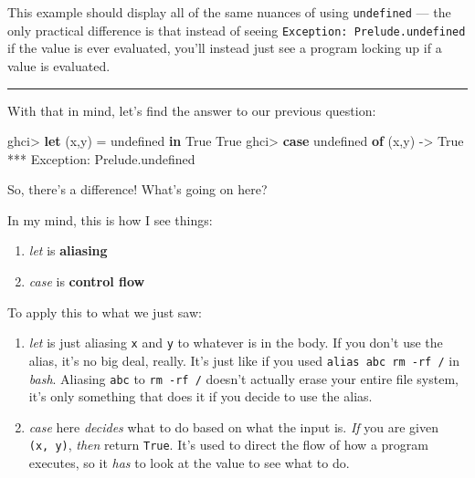 \documentclass[]{article}
\newenvironment{Shaded}{}{}
\newcommand{\DataTypeTok}[1]{\textcolor[rgb]{0.56,0.13,0.00}{#1}}
\newcommand{\FunctionTok}[1]{\textcolor[rgb]{0.02,0.16,0.49}{#1}}
\newcommand{\KeywordTok}[1]{\textcolor[rgb]{0.00,0.44,0.13}{\textbf{#1}}}
\newcommand{\NormalTok}[1]{#1}
\newcommand{\OperatorTok}[1]{\textcolor[rgb]{0.40,0.40,0.40}{#1}}
\newcommand{\OtherTok}[1]{\textcolor[rgb]{0.00,0.44,0.13}{#1}}
\begin{document}
This example should display all of the same nuances of using \texttt{undefined}
--- the only practical difference is that instead of seeing
\texttt{Exception:\ Prelude.undefined} if the value is ever evaluated, you'll
instead just see a program locking up if a value is evaluated.

\begin{center}\rule{0.5\linewidth}{\linethickness}\end{center}

With that in mind, let's find the answer to our previous question:

\begin{Shaded}
\begin{Highlighting}[]
\NormalTok{ghci}\OperatorTok{>} \KeywordTok{let}\NormalTok{ (x,y) }\OtherTok{=} \FunctionTok{undefined} \KeywordTok{in} \DataTypeTok{True}
\DataTypeTok{True}
\NormalTok{ghci}\OperatorTok{>} \KeywordTok{case} \FunctionTok{undefined} \KeywordTok{of}\NormalTok{ (x,y) }\OtherTok{{-}>} \DataTypeTok{True}
\OperatorTok{***} \DataTypeTok{Exception}\OperatorTok{:}\NormalTok{ Prelude.undefined}
\end{Highlighting}
\end{Shaded}

So, there's a difference! What's going on here?

In my mind, this is how I see things:

\begin{enumerate}
\def\labelenumi{\arabic{enumi}.}
\tightlist
\item
  \emph{let} is \textbf{aliasing}
\item
  \emph{case} is \textbf{control flow}
\end{enumerate}

To apply this to what we just saw:

\begin{enumerate}
\def\labelenumi{\arabic{enumi}.}
\item
  \emph{let} is just aliasing \texttt{x} and \texttt{y} to whatever is in the
  body. If you don't use the alias, it's no big deal, really. It's just like if
  you used \texttt{alias\ abc\ rm\ -rf\ /} in \emph{bash}. Aliasing \texttt{abc}
  to \texttt{rm\ -rf\ /} doesn't actually erase your entire file system, it's
  only something that does it if you decide to use the alias.
\item
  \emph{case} here \emph{decides} what to do based on what the input is.
  \emph{If} you are given \texttt{(x,\ y)}, \emph{then} return \texttt{True}.
  It's used to direct the flow of how a program executes, so it \emph{has} to
  look at the value to see what to do.
\end{enumerate}
\end{document}
